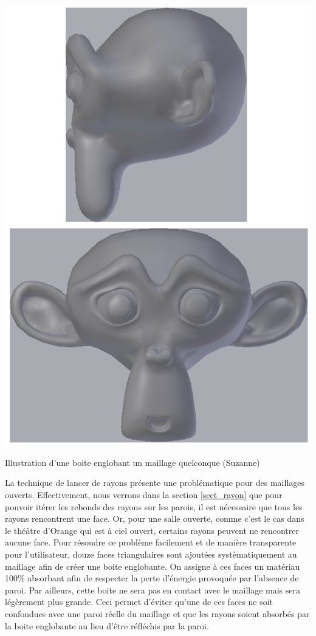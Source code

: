 \begin{figureth}
\begin{subfigureth}{0.35\textwidth}
		\includegraphics[width=\linewidth]{images/boiteenglobante2}
		\label{boiteenglobante2}
	\end{subfigureth}
	\caption{Illustration d'une boite englobant un maillage quelconque (Suzanne)}
\end{figureth}

La technique de lancer de rayons présente une problématique pour des maillages ouverts. Effectivement, nous verrons dans la section \ref{sect_rayon} que pour pouvoir itérer les rebonds des rayons sur les parois, il est nécessaire que tous les rayons rencontrent une face. Or, pour une salle ouverte, comme c'est le cas dans le théâtre d'Orange qui est à ciel ouvert, certains rayons peuvent ne rencontrer aucune face. Pour résoudre ce problème facilement et de manière transparente pour l'utilisateur, douze faces triangulaires sont ajoutées systèmatiquement au maillage afin de créer une boite englobante. On assigne à ces faces un matériau 100\% absorbant afin de respecter la perte d'énergie provoquée par l'absence de paroi. Par ailleurs, cette boite ne sera pas en contact avec le maillage mais sera légèrement plus grande. Ceci permet d'éviter qu'une de ces faces ne soit confondues avec une paroi réelle du maillage et que les rayons soient absorbés par la boite englobante au lieu d'être réfléchis par la paroi.




